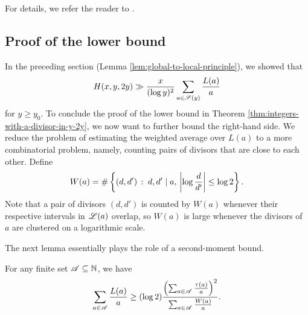 For details, we refer the reader to \cite[Section 7.6]{fordlecturenotes}.

\subsection{Proof of the lower bound}
    \label{subsec:proof-of-lower-bound}

In the preceding section (Lemma \ref{lem:global-to-local-principle}), we showed that 
\begin{equation*}
    H(x, y, 2y) \gg \frac{x}{(\log y)^2} \sum \limits_{a \in \mathscr{S}(y)} \frac{L(a)}{a}
\end{equation*}
for $y \ge y_0$.
To conclude the proof of the lower bound in Theorem \ref{thm:integers-with-a-divisor-in-y-2y}, we now want to further bound the right-hand side.
We reduce the problem of estimating the weighted average over $L(a)$ to a more combinatorial problem, namely, counting pairs of divisors that are close to each other. 
Define
\begin{equation*}
    W(a) = \# \left\{(d, d')\,:\;d,d' \mid a,\, \left| \log \frac{d}{d'}\right| \le \log 2\right\}.
\end{equation*}
Note that a pair of divisors $(d, d')$ is counted by $W(a)$ whenever their respective intervals in $\mathscr{L}(a)$ overlap, so $W(a)$ is large whenever the divisors of $a$ are clustered on a logarithmic scale.

The next lemma essentially plays the role of a second-moment bound.

\begin{lemma} \label{lem:snd-moment-bound}
    For any finite set $\mathscr{A} \subseteq \mathbb{N}$, we have
    \begin{equation*}
        \sum \limits_{a \in \mathscr{A}} \frac{L(a)}{a} \ge (\log 2) \frac{\left(\sum_{a \in \mathscr{A}} \frac{\tau (a)}{a} \right)^2}{\sum_{a \in \mathscr{A}} \frac{W(a)}{a}}.
    \end{equation*}
\end{lemma}

